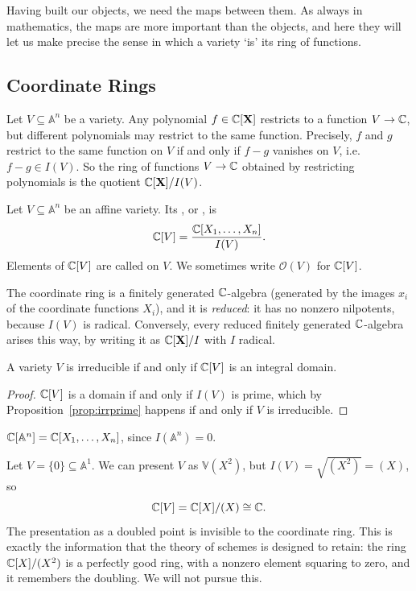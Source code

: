 \documentclass[a4paper]{scrartcl}
\newcommand{\A}{\mathbb{A}}
\newcommand{\V}{\mathbb{V}}
\newcommand{\Oh}{\mathcal{O}}
\begin{document}
Having built our objects, we need the maps between them. As always in mathematics, the maps are more important than the objects, and here they will let us make precise the sense in which a variety `is' its ring of functions.

\subsection{Coordinate Rings}

Let $V \subseteq \A^n$ be a variety. Any polynomial $f \in \mathbb{C}[\mathbf{X}]$ restricts to a function $V \to \mathbb{C}$, but different polynomials may restrict to the same function. Precisely, $f$ and $g$ restrict to the same function on $V$ if and only if $f - g$ vanishes on $V$, i.e.\ $f - g \in I(V)$. So the ring of functions $V \to \mathbb{C}$ obtained by restricting polynomials is the quotient $\mathbb{C}[\mathbf{X}]/I(V)$.

\begin{definition}
	Let $V \subseteq \A^n$ be an affine variety. Its , or , is
	$$\mathbb{C}[V] = \frac{\mathbb{C}[X_1,\dots,X_n]}{I(V)}.$$
	Elements of $\mathbb{C}[V]$ are called  on $V$. We sometimes write $\Oh(V)$ for $\mathbb{C}[V]$.
\end{definition}

The coordinate ring is a finitely generated $\mathbb{C}$-algebra (generated by the images $x_i$ of the coordinate functions $X_i$), and it is \emph{reduced}: it has no nonzero nilpotents, because $I(V)$ is radical. Conversely, every reduced finitely generated $\mathbb{C}$-algebra arises this way, by writing it as $\mathbb{C}[\mathbf{X}]/I$ with $I$ radical.

\begin{corollary}
	A variety $V$ is irreducible if and only if $\mathbb{C}[V]$ is an integral domain.
\end{corollary}

\begin{proof}
	$\mathbb{C}[V]$ is a domain if and only if $I(V)$ is prime, which by Proposition~\ref{prop:irrprime} happens if and only if $V$ is irreducible.
\end{proof}

\begin{example}
	$\C[\A^n] = \C[X_1,\dots,X_n]$, since $I(\A^n) = 0$.
\end{example}

\begin{example}
	Let $V = \{0\} \subseteq \A^1$. We can present $V$ as $\V(X^2)$, but $I(V) = \sqrt{(X^2)} = (X)$, so
	$$\mathbb{C}[V] = \mathbb{C}[X]/(X) \cong \mathbb{C}.$$
	The presentation as a doubled point is invisible to the coordinate ring. This is exactly the information that the theory of schemes is designed to retain: the ring $\mathbb{C}[X]/(X^2)$ is a perfectly good ring, with a nonzero element squaring to zero, and it remembers the doubling. We will not pursue this.
\end{example}
\end{document}
